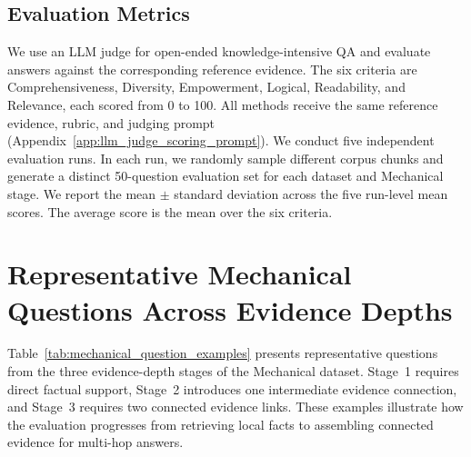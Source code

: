 \documentclass{article} %
\begin{document}
\subsection{Evaluation Metrics}

We use an LLM judge for open-ended knowledge-intensive QA \citep{Liu2023GEval,Zheng2023LLMJudge} and evaluate answers against the corresponding reference evidence. The six criteria are Comprehensiveness, Diversity, Empowerment, Logical, Readability, and Relevance, each scored from 0 to 100. All methods receive the same reference evidence, rubric, and judging prompt (Appendix~\ref{app:llm_judge_scoring_prompt}). We conduct five independent evaluation runs. In each run, we randomly sample different corpus chunks and generate a distinct 50-question evaluation set for each dataset and Mechanical stage. We report the mean $\pm$ standard deviation across the five run-level mean scores. The average score is the mean over the six criteria.

\section{Representative Mechanical Questions Across Evidence Depths}
\label{app:mechanical_question_examples}

Table~\ref{tab:mechanical_question_examples} presents representative questions from the three evidence-depth stages of the Mechanical dataset. Stage~1 requires direct factual support, Stage~2 introduces one intermediate evidence connection, and Stage~3 requires two connected evidence links. These examples illustrate how the evaluation progresses from retrieving local facts to assembling connected evidence for multi-hop answers.
\end{document}
